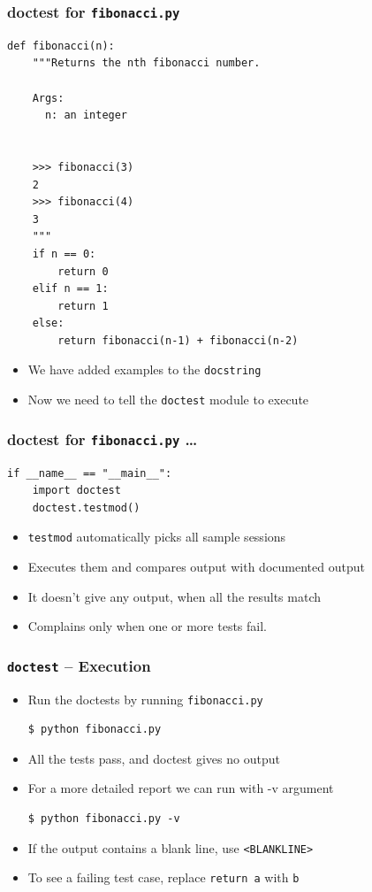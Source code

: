 \documentclass[12pt,presentation]{beamer}
\begin{document}
\begin{frame}[fragile]
  \frametitle{doctest for \texttt{fibonacci.py}}
\begin{tiny}
\begin{lstlisting}
def fibonacci(n):
    """Returns the nth fibonacci number.

    Args:
      n: an integer
    
    
    >>> fibonacci(3)
    2
    >>> fibonacci(4)
    3
    """
    if n == 0:
        return 0
    elif n == 1:
        return 1
    else:
        return fibonacci(n-1) + fibonacci(n-2) 
\end{lstlisting}
\end{tiny}
\begin{itemize}
\item We have added examples to the \texttt{docstring}
\item Now we need to tell the \texttt{doctest} module to execute
\end{itemize}
\end{frame}
\begin{frame}[fragile]
  \frametitle{doctest for \texttt{fibonacci.py} \ldots}
\begin{lstlisting}
if __name__ == "__main__":
    import doctest
    doctest.testmod()
\end{lstlisting}
\begin{itemize}
\item \texttt{testmod} automatically picks all sample sessions
\item Executes them and compares output with documented output
\item It doesn't give any output, when all the results match 
\item Complains only when one or more tests fail. 
\end{itemize}
\end{frame}
\begin{frame}[fragile]
  \frametitle{\texttt{doctest} -- Execution}
  \begin{itemize}
  \item Run the doctests by running \texttt{fibonacci.py}
\begin{lstlisting}
$ python fibonacci.py
\end{lstlisting} %
  \item All the tests pass, and doctest gives no output
  \item For a more detailed report we can run with -v argument
\begin{lstlisting}
$ python fibonacci.py -v
\end{lstlisting} %
  \item If the output contains a blank line, use \texttt{<BLANKLINE>}
  \item To see a failing test case, replace \texttt{return a} with \texttt{b}
  \end{itemize}
\end{frame}
\end{document}
